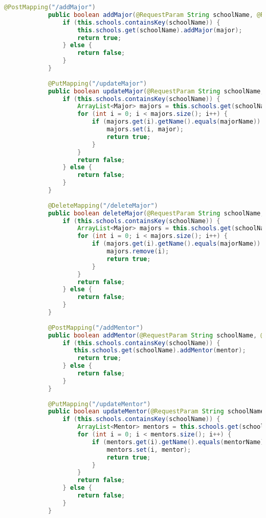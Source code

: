 \documentclass[UTF8]{ctexart}
\begin{document}
\begin{lstlisting}[language=java]
            @PostMapping("/addMajor")
            public boolean addMajor(@RequestParam String schoolName, @RequestBody Major major) {
                if (this.schools.containsKey(schoolName)) {
                    this.schools.get(schoolName).addMajor(major);
                    return true;
                } else {
                    return false;
                }
            }
        
            @PutMapping("/updateMajor")
            public boolean updateMajor(@RequestParam String schoolName, @RequestParam String majorName, @RequestBody Major major) {
                if (this.schools.containsKey(schoolName)) {
                    ArrayList<Major> majors = this.schools.get(schoolName).getMajors();
                    for (int i = 0; i < majors.size(); i++) {
                        if (majors.get(i).getName().equals(majorName)) {
                            majors.set(i, major);
                            return true;
                        }
                    }
                    return false;
                } else {
                    return false;
                }
            }
        
            @DeleteMapping("/deleteMajor")
            public boolean deleteMajor(@RequestParam String schoolName, @RequestParam String majorName) {
                if (this.schools.containsKey(schoolName)) {
                    ArrayList<Major> majors = this.schools.get(schoolName).getMajors();
                    for (int i = 0; i < majors.size(); i++) {
                        if (majors.get(i).getName().equals(majorName)) {
                            majors.remove(i);
                            return true;
                        }
                    }
                    return false;
                } else {
                    return false;
                }
            }
        
            @PostMapping("/addMentor")
            public boolean addMentor(@RequestParam String schoolName, @RequestBody Mentor mentor) {
                if (this.schools.containsKey(schoolName)) {
                   this.schools.get(schoolName).addMentor(mentor);
                    return true;
                } else {
                    return false;
                }
            }
        
            @PutMapping("/updateMentor")
            public boolean updateMentor(@RequestParam String schoolName, @RequestParam String mentorName, @RequestBody Mentor mentor) {
                if (this.schools.containsKey(schoolName)) {
                    ArrayList<Mentor> mentors = this.schools.get(schoolName).getMentors();
                    for (int i = 0; i < mentors.size(); i++) {
                        if (mentors.get(i).getName().equals(mentorName)) {
                            mentors.set(i, mentor);
                            return true;
                        }
                    }
                    return false;
                } else {
                    return false;
                }
            }
        

\end{lstlisting}
\end{document}
